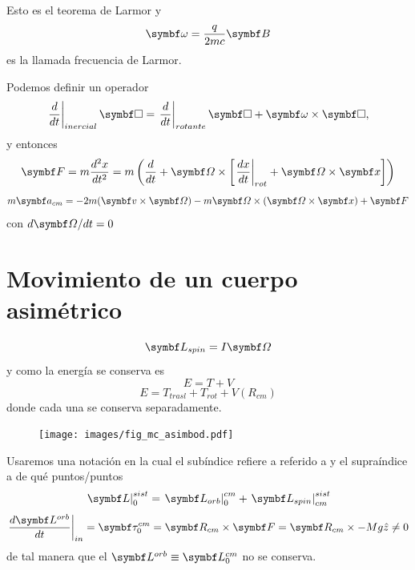 \documentclass[10pt,oneside]{CBFT_book}
\begin{document}
Esto es el teorema de Larmor y 
\[
	\vb{\omega} = \frac{q}{2 m c} \vb{B}
\]
es la llamada frecuencia de Larmor.

Podemos definir un operador 
\[
	\left.\dtot{}{t}\right|_{inercial} \vb{\Box} =  \left.\dtot{}{t}\right|_{rotante} \vb{\Box}
	+ \vb{\omega } \times \vb{ \Box },
\]
y entonces
\[
	\vb{F} = m \dtot[2]{x}{t} = m \left( \dtot{}{t} + \vb{\Omega} \times 
	\left[ \left.\dtot{x}{t}\right|_{rot} + \vb{\Omega} \times \vb{x} \right] \right)
\]
\[
	m \vb{a}_{cm} = - 2 m ( \vb{v}\times\vb{\Omega}) - m \vb{\Omega} \times (\vb{\Omega}\times\vb{x}) + \vb{F}
\]
con $d\vb{\Omega}/dt = 0$




\section{Movimiento de un cuerpo asimétrico}

\[
	\vb{L}_{spin} = I \vb{\Omega}
\]
y como la energía se conserva es
\[
	E = T + V
\]
\[
	E = T_{trasl} + T_{rot} + V(R_{cm})
\]
donde cada una se conserva separadamente.

\begin{figure}[htb]
	\begin{center}
	\texttt{[image: images/fig\_mc\_asimbod.pdf]}	 
	\end{center}
	\caption{}
\end{figure} 

Usaremos una notación en la cual el subíndice refiere a referido a y el supraíndice a de qué puntos/puntos
\[
	\left.\vb{L}\right|_{0}^{sist} = \left.\vb{L}_{orb}\right|_{0}^{cm} + \left.\vb{L}_{spin}\right|_{cm}^{sist}  
\]
\[
	\left.\frac{d\vb{L}^{orb}}{dt}\right|_{in} = \vb{\tau}_0^{cm} = \vb{R}_{cm} \times \vb{F} =
							\vb{R}_{cm} \times - M g \hat{z} \neq 0
\]
de tal manera que el $\vb{L}^{orb} \equiv \vb{L}_0^{cm}$ no se conserva.
\end{document}
